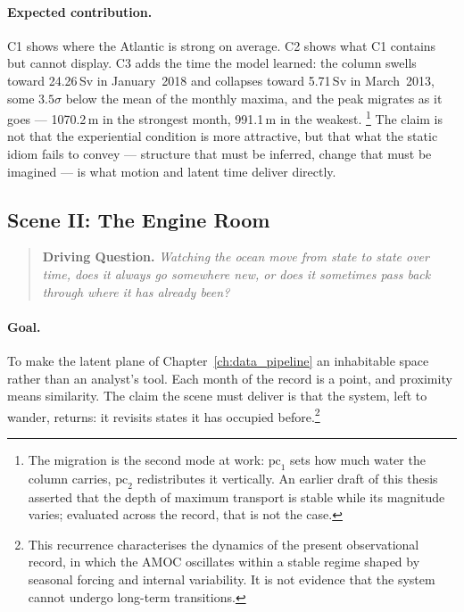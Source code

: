 \paragraph{Expected contribution.} C1 shows where the Atlantic is strong on average. C2 shows what C1 contains but cannot display. C3 adds the time the model learned: the column swells toward 24.26\,Sv in January~2018 and collapses toward 5.71\,Sv in March~2013, some $3.5\sigma$ below the mean of the monthly maxima, and the peak migrates as it goes --- 1070.2\,m in the strongest month, 991.1\,m in the weakest.
\footnote{The migration is the second mode at work: $\mathrm{pc}_1$ sets how much water the column carries, $\mathrm{pc}_2$ redistributes it vertically. An earlier draft of this thesis asserted that the depth of maximum transport is stable while its magnitude varies; evaluated across the record, that is not the case.} The claim is not that the experiential condition is more attractive, but that what the static idiom fails to convey --- structure that must be inferred, change that must be imagined --- is what motion and latent time deliver directly.

\subsection{Scene II: The Engine Room}
\label{subsec:scene-engine}

\begin{quote}
\textbf{Driving Question.} \emph{Watching the ocean move from state to state over time, does it always go somewhere new, or does it sometimes pass back through where it has already been?}
\end{quote}



\paragraph{Goal.} To make the latent plane of Chapter~\ref{ch:data_pipeline} an inhabitable space rather than an analyst's tool. Each month of the record is a point, and proximity means similarity. The claim the scene must deliver is that the system, left to wander, returns: it revisits states it has occupied before.\footnote{This recurrence characterises the dynamics of the present observational record, in which the AMOC oscillates within a stable regime shaped by seasonal forcing and internal variability. It is not evidence that the system cannot undergo long-term transitions.}


